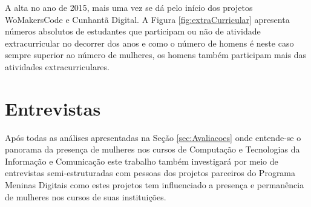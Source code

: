 A alta no ano de 2015, mais uma vez se dá pelo início dos projetos WoMakersCode e Cunhantã Digital. A Figura \ref{fig:extraCurricular} apresenta números absolutos de estudantes que participam ou não de atividade extracurricular no decorrer dos anos e como o número de homens é neste caso sempre superior ao número de mulheres, os homens também participam mais das atividades extracurriculares. 









\section{Entrevistas}\label{sec:Questionario}
Após todas as análises apresentadas na Seção \ref{sec:Avaliacoes} onde entende-se o panorama da presença de mulheres nos cursos de Computação e Tecnologias da Informação e Comunicação este trabalho também investigará por meio de entrevistas semi-estruturadas com pessoas dos projetos parceiros do Programa Meninas Digitais como estes projetos tem influenciado a presença e permanência de mulheres nos cursos de suas instituições.

